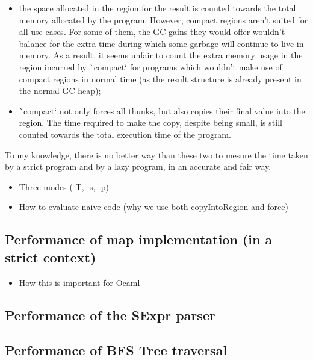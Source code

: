 \documentclass[english]{jflart}
\begin{document}
\begin{itemize}
  \item the space allocated in the region for the result is counted towards the total memory allocated by the program. However, compact regions aren't suited for all use-cases. For some of them, the GC gains they would offer wouldn't balance for the extra time during which some garbage will continue to live in memory. As a result, it seems unfair to count the extra memory usage in the region incurred by \texttt`compact` for programs which wouldn't make use of compact regions in normal time (as the result structure is already present in the normal GC heap);
  \item \texttt`compact` not only forces all thunks, but also copies their final value into the region. The time required to make the copy, despite being small, is still counted towards the total execution time of the program.
\end{itemize}

To my knowledge, there is no better way than these two to mesure the time taken by a strict program and by a lazy program, in an accurate and fair way.


\begin{itemize}
\item Three modes (-T, -s, -p)
\item How to evaluate naive code (why we use both copyIntoRegion and force)
\end{itemize}

\subsection{Performance of map implementation (in a strict context)}

\begin{itemize}
\item How this is important for Ocaml
\end{itemize}

\subsection{Performance of the SExpr parser}

\subsection{Performance of BFS Tree traversal}\label{ssec:benchmark-parser}
\end{document}
